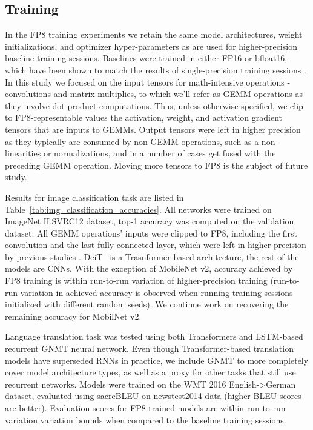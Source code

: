 \subsection{Training}
 In the FP8 training experiments we retain the same model architectures, weight initializations, and optimizer hyper-parameters as are used for higher-precision baseline training sessions. Baselines were trained in either FP16 or bfloat16, which have been shown to match the results of single-precision training sessions \cite{mpt2017, bfloat2020}. In this study we focused on the input tensors for math-intensive operations - convolutions and matrix multiplies, to which we'll refer as GEMM-operations as they involve dot-product computations. Thus, unless otherwise specified, we clip to FP8-representable values the activation, weight, and activation gradient tensors that are inputs to GEMMs. Output tensors were left in higher precision as they typically are consumed by non-GEMM operations, such as a non-linearities or normalizations, and in a number of cases get fused with the preceding GEMM operation. Moving more tensors to FP8 is the subject of future study.

 Results for image classification task are listed in Table~\ref{tab:img_classification_accuracies}. All networks were trained on ImageNet ILSVRC12 dataset, top-1 accuracy was computed on the validation dataset. All GEMM operations' inputs were clipped to FP8, including the first convolution and the last fully-connected layer, which were left in higher precision by previous studies \cite{fp8_intel_2019, fp8_ibm_2018}. DeiT~\cite{deit_2021} is a Trasnformer-based architecture, the rest of the models are CNNs. With the exception of MobileNet v2, accuracy achieved by FP8 training is within run-to-run variation of higher-precision training (run-to-run variation in achieved accuracy is observed when running training sessions initialized with different random seeds). We continue work on recovering the remaining accuracy for MobilNet v2.

Language translation task was tested using both Transformers and LSTM-based recurrent GNMT neural network. Even though Transformer-based translation models have superseded RNNs in practice, we include GNMT to more completely cover model architecture types, as well as a proxy for other tasks that still use recurrent networks. Models were trained on the WMT 2016 English->German dataset, evaluated using sacreBLEU on newstest2014 data (higher BLEU scores are better). Evaluation scores for FP8-trained models are within run-to-run variation variation bounds when compared to the baseline training sessions.

